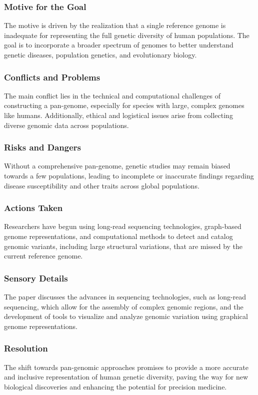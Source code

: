 \subsubsection{Motive for the Goal}
The motive is driven by the realization that a single reference genome is inadequate for representing the full genetic diversity of human populations. The goal is to incorporate a broader spectrum of genomes to better understand genetic diseases, population genetics, and evolutionary biology.

\subsubsection{Conflicts and Problems}
The main conflict lies in the technical and computational challenges of constructing a pan-genome, especially for species with large, complex genomes like humans. Additionally, ethical and logistical issues arise from collecting diverse genomic data across populations.

\subsubsection{Risks and Dangers}
Without a comprehensive pan-genome, genetic studies may remain biased towards a few populations, leading to incomplete or inaccurate findings regarding disease susceptibility and other traits across global populations.

\subsubsection{Actions Taken}
Researchers have begun using long-read sequencing technologies, graph-based genome representations, and computational methods to detect and catalog genomic variants, including large structural variations, that are missed by the current reference genome.

\subsubsection{Sensory Details}
The paper discusses the advances in sequencing technologies, such as long-read sequencing, which allow for the assembly of complex genomic regions, and the development of tools to visualize and analyze genomic variation using graphical genome representations.

\subsubsection{Resolution}
The shift towards pan-genomic approaches promises to provide a more accurate and inclusive representation of human genetic diversity, paving the way for new biological discoveries and enhancing the potential for precision medicine.


